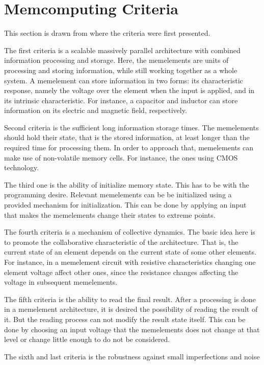 \section{Memcomputing Criteria}
\label{sec:new}

This section is drawn from \citep{DiVentra:2012fh} where the criteria were first presented.

The first criteria is a scalable massively parallel architecture with combined information processing and storage.
Here, the memelements are units of processing and storing information, while still working together as a whole system.
A memelement can store information in two forms: its characteristic response, namely the voltage over the element when the input is applied, and in its intrinsic characteristic.
For instance, a capacitor and inductor can store information on its electric and magnetic field, respectively.

Second criteria is the sufficient long information storage times.
The memelements should hold their state, that is the stored information, at least longer than the required time for processing them.
In order to approach that, memelements can make use of non-volatile memory cells.
For instance, the ones using CMOS technology.

The third one is the ability of initialize memory state.
This has to be with the programming desire.
Relevant memelements can be be initialized using a provided mechanism for initialization.
This can be done by applying an input that makes the memelements change their states to extreme points.

The fourth criteria is a mechanism of collective dynamics.
The basic idea here is to promote the collaborative characteristic of the architecture.
That is, the current state of an element depends on the current state of some other elements.
For instance, in a memelement circuit with resistive characteristics changing one element voltage affect other ones, since the resistance changes affecting the voltage in subsequent memelements.

The fifth criteria is the ability to read the final result.
After a processing is done in a memelement architecture, it is desired the possibility of reading the result of it.
But the reading process can not modify the result state itself.
This can be done by choosing an input voltage that the memelements does not change at that level or change little enough to do not be considered.

The sixth and last criteria is the robustness against small imperfections and noise